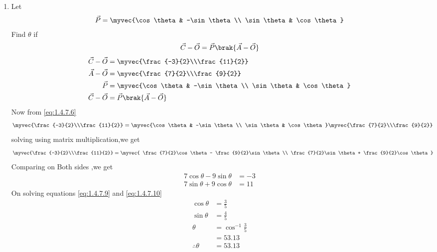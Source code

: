 \documentclass[11pt]{book}
\begin{document}
\begin{enumerate}[label=\thesection.\arabic*.,ref=\thesection.\theenumi]
\item Let 
\begin{align}
\vec{P} = \myvec{\cos \theta & -\sin \theta \\ \sin \theta & \cos \theta}
\end{align}
Find $\theta$ if 
\begin{align}
\vec{C}-\vec{O}=\vec{P}\brak{\vec{A}-\vec{O}}
\end{align}
\solution
\begin{align}
    \vec{C}-\vec{O}
	  & =\myvec{\frac{-3}{2}\\\frac{11}{2}}\\
\vec{A}-\vec{O}
	 & =\myvec{\frac{7}{2}\\\frac{9}{2}}
	  \\
\vec{P} &= \myvec{\cos \theta & -\sin \theta \\ \sin \theta & \cos \theta} \\
   \vec{C}-\vec{O}&=\vec{P}\brak{\vec{A}-\vec{O}} \label{eq:1.4.7.6}
\end{align}
 Now from \eqref{eq:1.4.7.6}
 \begin{align}
 \myvec{\frac{-3}{2}\\\frac{11}{2}} &= \myvec{\cos \theta & -\sin \theta \\ \sin \theta & \cos \theta} \myvec{\frac{7}{2}\\\frac{9}{2}}    
 \end{align}
solving using matrix multiplication,we get
\begin{align}
	\myvec{\frac{-3}{2}\\\frac{11}{2}} &= \myvec{ \frac{7}{2}\cos\theta - \frac{9}{2}\sin\theta \\ \frac{7}{2}\sin\theta + \frac{9}{2}\cos\theta}
\end{align}
Comparing on Both sides ,we get
\begin{align}
     7\cos\theta - 9\sin\theta &= -3   \label{eq:1.4.7.9}\\
 7\sin\theta + 9\cos\theta &= 11 \label{eq:1.4.7.10}
\end{align}
On solving equations \eqref{eq:1.4.7.9}  and \eqref{eq:1.4.7.10}
\begin{align}
    \cos\theta&= \frac{3}{5} \\
    \sin\theta&= \frac{4}{5} \\
    \theta &=\cos^{-1}\frac{3}{5} \\
            &= 53.13 \\
	    \therefore \theta &= 53.13
\end{align}
\end{enumerate}

\latexprintindex
\end{document}
